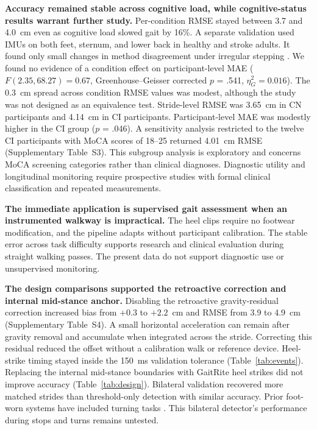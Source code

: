 \documentclass[fleqn,10pt,lineno]{wlpeerj}
\begin{document}
\textbf{Accuracy remained stable across cognitive load, while cognitive-status results warrant further study.} Per-condition RMSE stayed between 3.7 and 4.0~cm even as cognitive load slowed gait by 16\%. A separate validation used IMUs on both feet, sternum, and lower back in healthy and stroke adults. It found only small changes in method disagreement under irregular stepping \citep{Ensink2023}. We found no evidence of a condition effect on participant-level MAE ($F(2.35, 68.27) = 0.67$, Greenhouse--Geisser corrected $p$ = .541, $\eta^2_G = 0.016$). The 0.3~cm spread across condition RMSE values was modest, although the study was not designed as an equivalence test. Stride-level RMSE was 3.65~cm in CN participants and 4.14~cm in CI participants. Participant-level MAE was modestly higher in the CI group ($p$ = .046). A sensitivity analysis restricted to the twelve CI participants with MoCA scores of 18--25 returned 4.01~cm RMSE (Supplementary Table~S3). This subgroup analysis is exploratory and concerns MoCA screening categories rather than clinical diagnoses. Diagnostic utility and longitudinal monitoring require prospective studies with formal clinical classification and repeated measurements.

\textbf{The immediate application is supervised gait assessment when an instrumented walkway is impractical.} The heel clips require no footwear modification, and the pipeline adapts without participant calibration. The stable error across task difficulty supports research and clinical evaluation during straight walking passes. The present data do not support diagnostic use or unsupervised monitoring.

\textbf{The design comparisons supported the retroactive correction and internal mid-stance anchor.} Disabling the retroactive gravity-residual correction increased bias from $+0.3$ to $+2.2$~cm and RMSE from 3.9 to 4.9~cm (Supplementary Table~S4). A small horizontal acceleration can remain after gravity removal and accumulate when integrated across the stride. Correcting this residual reduced the offset without a calibration walk or reference device. Heel-strike timing stayed inside the 150~ms validation tolerance (Table~\ref{tab:events}). Replacing the internal mid-stance boundaries with GaitRite heel strikes did not improve accuracy (Table~\ref{tab:design}). Bilateral validation recovered more matched strides than threshold-only detection with similar accuracy. Prior foot-worn systems have included turning tasks \citep{Mariani2010}. This bilateral detector's performance during stops and turns remains untested.
\end{document}
